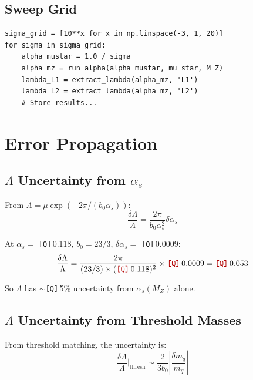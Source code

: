 \documentclass[11pt,a4paper]{article}
\newcommand{\Qnum}[1]{\textcolor{red!70!black}{\texttt{[Q]}}\,#1}
\theoremstyle{definition}
\begin{document}
\subsection{Sweep Grid}
\label{subsec:sweep-grid}

\begin{verbatim}
sigma_grid = [10**x for x in np.linspace(-3, 1, 20)]
for sigma in sigma_grid:
    alpha_mustar = 1.0 / sigma
    alpha_mz = run_alpha(alpha_mustar, mu_star, M_Z)
    lambda_L1 = extract_lambda(alpha_mz, 'L1')
    lambda_L2 = extract_lambda(alpha_mz, 'L2')
    # Store results...
\end{verbatim}

\section{Error Propagation}
\label{app:error-prop}

\subsection{$\Lambda$ Uncertainty from $\alpha_s$}
\label{subsec:lambda-from-alpha-uncert}

From $\Lambda = \mu \exp(-2\pi/(b_0\alpha_s))$:
\begin{equation}
\label{eq:dlambda-dalpha}
\frac{\delta\Lambda}{\Lambda} = \frac{2\pi}{b_0\alpha_s^2}\delta\alpha_s
\end{equation}

At $\alpha_s = $ \Qnum{0.118}, $b_0 = 23/3$, $\delta\alpha_s = $ \Qnum{0.0009}:
\begin{equation}
\label{eq:dlambda-numeric}
\frac{\delta\Lambda}{\Lambda} = \frac{2\pi}{(23/3) \times (\Qnum{0.118})^2} \times \Qnum{0.0009}
  = \Qnum{0.053}
\end{equation}

So $\Lambda$ has $\sim$\Qnum{5}\% uncertainty from $\alpha_s(M_Z)$ alone.

\subsection{$\Lambda$ Uncertainty from Threshold Masses}
\label{subsec:lambda-from-thresh-uncert}

From threshold matching, the uncertainty is:
\begin{equation}
\label{eq:dlambda-thresh}
\frac{\delta\Lambda}{\Lambda}\bigg|_{\text{thresh}} \sim
  \frac{2}{3b_0}\left|\frac{\delta m_q}{m_q}\right|
\end{equation}
\end{document}
